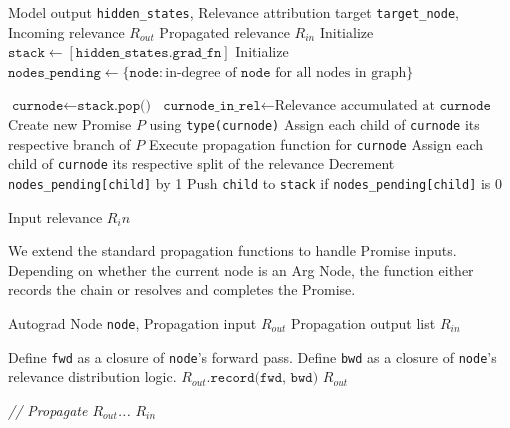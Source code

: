 \documentclass{article}
\begin{document}
\begin{algorithm}[H]
  \caption{Operation-Level Relevance Propagation With Promises}
  \label{alg:promise-propagation}
  \begin{algorithmic}[1]
    \Require Model output \texttt{hidden\_states}, Relevance attribution target \texttt{target\_node}, Incoming relevance $R_{out}$
    \Ensure Propagated relevance $R_{in}$
    \State Initialize $\texttt{stack} \gets [\texttt{hidden\_states.grad\_fn}]$
    \State Initialize $\texttt{nodes\_pending} \gets \{ \texttt{node} : \text{in-degree of } \texttt{node} \text{ for all nodes in graph}\}$

    \Repeat
      \State $\texttt{curnode} \gets \texttt{stack.pop()}$ 
      \State $\texttt{curnode\_in\_rel} \gets \text{Relevance accumulated at } \texttt{curnode}$
       
        \State Create new Promise $P$ using \texttt{type(curnode)}
        \State Assign each child of \texttt{curnode} its respective branch of $P$ 
      \Else
        \State Execute propagation function for \texttt{curnode} 
        \State Assign each child of \texttt{curnode} its respective split of the relevance
      \EndIf
        \State Decrement \texttt{nodes\_pending[child]} by 1 
        \State Push \texttt{child} to \texttt{stack} if \texttt{nodes\_pending[child]} is 0 
      \EndFor
     

  \State \Return Input relevance $R_in$
  \end{algorithmic}
\end{algorithm}

We extend the standard propagation functions to handle Promise inputs. Depending on whether the current node is an
Arg Node, the function either records the chain or resolves and completes the Promise.

\begin{algorithm}[H]
  \caption{Non-Arg Node Propagation Function Promise Handling}
  \label{alg:non-argnode-propagation}
  \begin{algorithmic}[1]
    \Require Autograd Node \texttt{node}, Propagation input $R_{out}$
    \Ensure Propagation output list $R_{in}$

     
      \State Define \texttt{fwd} as a closure of \texttt{node}'s forward pass.
      \State Define \texttt{bwd} as a closure of \texttt{node}'s relevance distribution logic.
      \State $R_{out}\texttt{.record(fwd, bwd)}$
      \Return $R_{out}$
    \EndIf

    \State \textit{// Propagate $R_{out}$...} 
    \State \Return $R_{in}$
  \end{algorithmic}
\end{algorithm}
\end{document}
